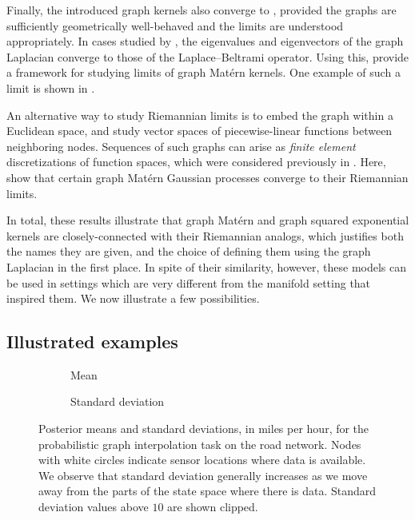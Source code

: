 \documentclass[11pt]{book}
\begin{document}
Finally, the introduced graph kernels also converge to , provided the graphs are sufficiently geometrically well-behaved and the limits are understood appropriately.
In cases studied by \textcite{belkin07,burago14}, the eigenvalues and eigenvectors of the graph Laplacian converge to those of the Laplace--Beltrami operator.
Using this, \textcite{sanzalonso21} provide a framework for studying limits of graph Matérn kernels.
One example of such a limit is shown in .

An alternative way to study Riemannian limits is to embed the graph within a Euclidean space, and study vector spaces of piecewise-linear functions between neighboring nodes.
Sequences of such graphs can arise as \emph{finite element} discretizations of function spaces, which were considered previously in .
Here, \textcite{lindgren11} show that certain graph Matérn Gaussian processes converge to their Riemannian limits.

In total, these results illustrate that graph Matérn and graph squared exponential kernels are closely-connected with their Riemannian analogs, which justifies both the names they are given, and the choice of defining them using the graph Laplacian in the first place.
In spite of their similarity, however, these models can be used in settings which are very different from the manifold setting that inspired them.
We now illustrate a few possibilities.

\subsection{Illustrated examples}

\begin{figure}
\begin{subfigure}{0.49\textwidth}

\caption{Mean}
\end{subfigure}
\begin{subfigure}{0.49\textwidth}

\caption{Standard deviation}
\end{subfigure}
\caption[Posterior Gaussian process: traffic data, global view]{Posterior means and standard deviations, in miles per hour, for the probabilistic graph interpolation task on the road network. Nodes with white circles indicate sensor locations where data is available. We observe that standard deviation generally increases as we move away from the parts of the state space where there is data. Standard deviation values above $10$ are shown clipped. }
\label{fig:graph-posterior}
\end{figure}
\end{document}
